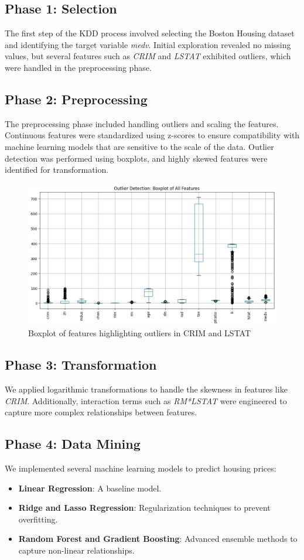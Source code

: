 \documentclass[12pt]{article}
\begin{document}
\subsection{Phase 1: Selection}
The first step of the KDD process involved selecting the Boston Housing dataset and identifying the target variable \textit{medv}. Initial exploration revealed no missing values, but several features such as \textit{CRIM} and \textit{LSTAT} exhibited outliers, which were handled in the preprocessing phase.

\subsection{Phase 2: Preprocessing}
The preprocessing phase included handling outliers and scaling the features. Continuous features were standardized using z-scores to ensure compatibility with machine learning models that are sensitive to the scale of the data. Outlier detection was performed using boxplots, and highly skewed features were identified for transformation.

\begin{figure}[H]
\centering
\includegraphics[width=0.7\linewidth]{boxplot_outliers.png}
\caption{Boxplot of features highlighting outliers in CRIM and LSTAT}
\label{fig:boxplot}
\end{figure}

\subsection{Phase 3: Transformation}
We applied logarithmic transformations to handle the skewness in features like \textit{CRIM}. Additionally, interaction terms such as \textit{RM*LSTAT} were engineered to capture more complex relationships between features.

\subsection{Phase 4: Data Mining}
We implemented several machine learning models to predict housing prices:
\begin{itemize}
    \item \textbf{Linear Regression}: A baseline model.
    \item \textbf{Ridge and Lasso Regression}: Regularization techniques to prevent overfitting.
    \item \textbf{Random Forest and Gradient Boosting}: Advanced ensemble methods to capture non-linear relationships.
\end{itemize}
\end{document}
